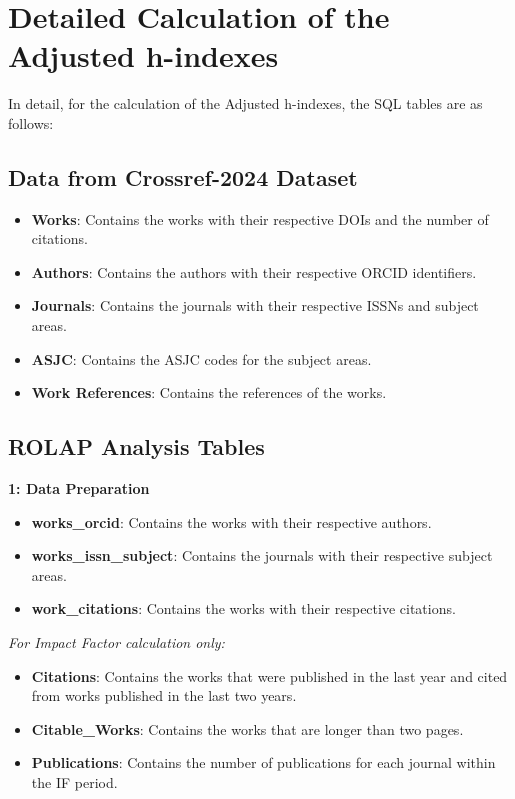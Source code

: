 \section{Detailed Calculation of the Adjusted h-indexes}

In detail, for the calculation of the Adjusted h-indexes, the SQL tables are as
follows:

\subsection{Data from Crossref-2024 Dataset}
\begin{itemize}
      \item \textbf{Works}: Contains the works with their respective DOIs and the number of citations.
      \item \textbf{Authors}: Contains the authors with their respective ORCID identifiers.
      \item \textbf{Journals}: Contains the journals with their respective ISSNs and subject areas.
      \item \textbf{ASJC}: Contains the ASJC codes for the subject areas.
      \item \textbf{Work References}: Contains the references of the works.
\end{itemize}

\subsection{ROLAP Analysis Tables}

\noindent\textbf{1: Data Preparation}
\begin{itemize}
      \item \textbf{works\_orcid}: Contains the works with their respective authors.
      \item \textbf{works\_issn\_subject}: Contains the journals with their respective subject areas.
      \item \textbf{work\_citations}: Contains the works with their respective citations.
\end{itemize}

\vspace{1em} %
\noindent\emph{For Impact Factor calculation only:}
\begin{itemize}
      \item \textbf{Citations}: Contains the works that were published in the last year and cited from works published in the last two years.
      \item \textbf{Citable\_Works}: Contains the works that are longer than two pages.
      \item \textbf{Publications}: Contains the number of publications for each journal within the IF period.
\end{itemize}

